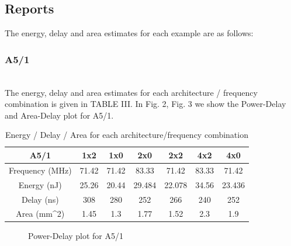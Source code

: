 \subsection{Reports}
The energy, delay and area estimates for each example are as follows:

\subsubsection{A5/1}
\\
The energy, delay and area estimates for each architecture / frequency combination is given in TABLE III.
In Fig. 2,  Fig. 3 we show the Power-Delay and Area-Delay plot for A5/1. 
\begin{table}[h!]
\caption{Energy / Delay / Area for each architecture/frequency combination}
\begin{center}
{\begin{tabular}{c | c   c   c   c    c   c}
\hline
A5/1 &1x2 &1x0 &2x0 &2x2 &4x2 &4x0 \\ [1ex]
\hline
Frequency (MHz) & 71.42& 71.42& 83.33& 71.42& 83.33& 71.42 \\ [1ex]
Energy (nJ) &25.26 &20.44 &29.484 &22.078 &34.56 &23.436 \\ [1ex]

Delay (ns)& 308& 280& 252& 266& 240& 252\\[1ex] 
Area (mm^2)& 1.45& 1.3& 1.77& 1.52& 2.3& 1.9\\[1ex]
\hline

\end{tabular}}
\label{diffstruc}
\end{center}
\end{table}


\begin{figure}[h!]
{\centering {} \par}
\caption{Power-Delay plot for A5/1}
\end{figure}


